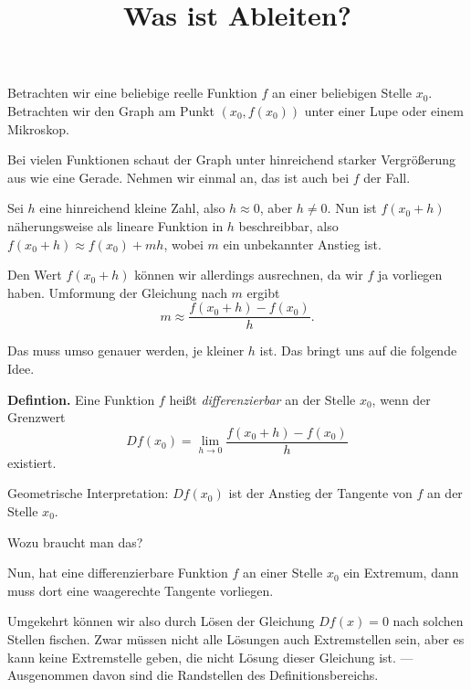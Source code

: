 \documentclass{beamer}
\title{Was ist Ableiten?}
\date{}
\newcommand{\strong}[1]{\textsf{\textbf{#1}}}
\begin{document}
\begin{frame}
\maketitle
\end{frame}

\begin{frame}
Betrachten wir eine beliebige reelle Funktion $f$ an einer beliebigen
Stelle $x_0$. Betrachten wir den Graph am Punkt $(x_0,f(x_0))$
unter einer Lupe oder einem Mikroskop.
\end{frame}

\begin{frame}
Bei vielen Funktionen schaut der Graph unter hinreichend starker
Vergrößerung aus wie eine Gerade. Nehmen wir einmal an, das ist
auch bei $f$ der Fall.
\end{frame}

\begin{frame}
Sei $h$ eine hinreichend kleine Zahl, also $h\approx 0$, aber $h\ne 0$.
Nun ist $f(x_0+h)$ näherungsweise als lineare Funktion in $h$
beschreibbar, also $f(x_0+h)\approx f(x_0)+mh$, wobei $m$ ein
unbekannter Anstieg ist.
\end{frame}

\begin{frame}
Den Wert $f(x_0+h)$ können wir allerdings ausrechnen, da wir $f$
ja vorliegen haben. Umformung der Gleichung nach $m$ ergibt
\[m \approx \frac{f(x_0+h)-f(x_0)}{h}.\]
\end{frame}

\begin{frame}
Das muss umso genauer werden, je kleiner $h$ ist. Das bringt uns
auf die folgende Idee.
\end{frame}

\begin{frame}
\strong{Defintion.} Eine Funktion $f$ heißt \emph{differenzierbar}
an der Stelle $x_0$, wenn der Grenzwert
\[Df(x_0) = \lim_{h\to 0}\frac{f(x_0+h)-f(x_0)}{h}\]
existiert.
\end{frame}

\begin{frame}
Geometrische Interpretation: $Df(x_0)$ ist der Anstieg der Tangente
von $f$ an der Stelle $x_0$.
\end{frame}

\begin{frame}
Wozu braucht man das?
\end{frame}

\begin{frame}
Nun, hat eine differenzierbare Funktion $f$ an einer Stelle $x_0$ ein
Extremum, dann muss dort eine waagerechte Tangente vorliegen.

\vspace{1em}
Umgekehrt können wir also durch Lösen der Gleichung $Df(x)=0$ nach
solchen Stellen fischen. Zwar müssen nicht alle Lösungen auch
Extremstellen sein, aber es kann keine Extremstelle geben, die nicht
Lösung dieser Gleichung ist. {\footnotesize
--- Ausgenommen davon sind die Randstellen des Definitionsbereichs.}
\end{frame}
\end{document}
